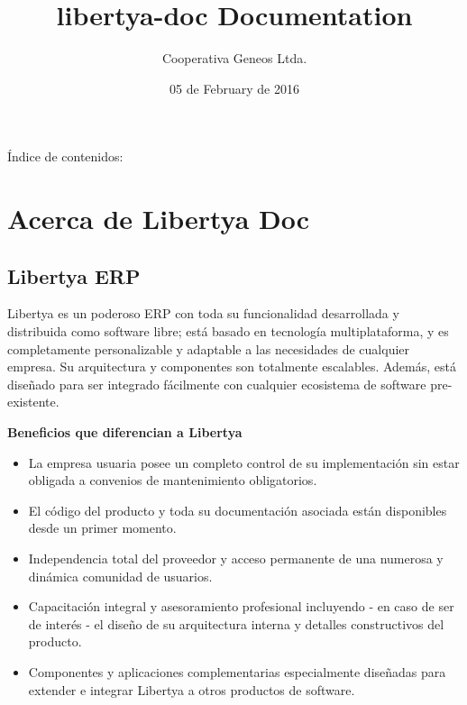 \documentclass[letterpaper,10pt,spanish]{sphinxmanual}
\title{libertya-doc Documentation}
\date{05 de February de 2016}
\author{Cooperativa Geneos Ltda.}
\begin{document}
\maketitle
\tableofcontents
{}\label{index::doc}


Índice de contenidos:


\chapter{Acerca de Libertya Doc}
\label{all-about-me:acerca-de-libertya-doc}\label{all-about-me::doc}\label{all-about-me:documentacion-de-libertya-erp-mrp}

\section{Libertya ERP}
\label{all-about-me:libertya-erp}
Libertya es un poderoso ERP con toda su funcionalidad desarrollada y distribuida como software libre; está basado en tecnología multiplataforma, y es completamente personalizable y adaptable a las necesidades de cualquier empresa. Su arquitectura y componentes son totalmente escalables. Además, está diseñado para ser integrado fácilmente con cualquier ecosistema de software pre-existente.

\textbf{Beneficios que diferencian a Libertya}
\begin{itemize}
\item {} 
La empresa usuaria posee un completo control de su implementación sin estar obligada a convenios de mantenimiento obligatorios.

\item {} 
El código del producto y toda su documentación asociada están disponibles desde un primer momento.

\item {} 
Independencia total del proveedor y acceso permanente de una numerosa y dinámica comunidad de usuarios.

\item {} 
Capacitación integral y asesoramiento profesional incluyendo - en caso de ser de interés - el diseño de su arquitectura interna y detalles constructivos del producto.

\item {} 
Componentes y aplicaciones complementarias especialmente diseñadas para extender e integrar Libertya a otros productos de software.

\end{itemize}
\end{document}
